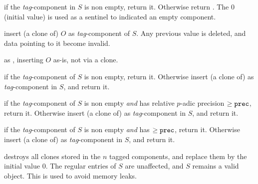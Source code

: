  if the \emph{tag}-component in $S$
is non empty, return it. Otherwise return . The  $0$
(initial value) is used as a sentinel to indicated an empty component.

 insert (a clone of) $O$
as \emph{tag}-component of $S$. Any previous value is deleted, and
data pointing to it become invalid.

 as ,
inserting $O$ as-is, not via a clone.

 if the
\emph{tag}-component of $S$ is non empty, return it. Otherwise insert
(a clone of)  as \emph{tag}-component in $S$, and return it.

if the \emph{tag}-component of $S$ is non empty \emph{and} has relative
$p$-adic precision $\geq {\tt prec}$, return it. Otherwise insert (a clone
of)  as \emph{tag}-component in $S$, and return it.

 if the \emph{tag}-component of $S$ is non empty \emph{and} has
 $\geq {\tt prec}$, return it. Otherwise insert (a clone of)
 as \emph{tag}-component in $S$, and return it.

 destroys all clones stored in the $n$ tagged
components, and replace them by the initial value $0$. The regular entries of
$S$ are unaffected, and $S$ remains a valid object. This is used to
avoid memory leaks.
